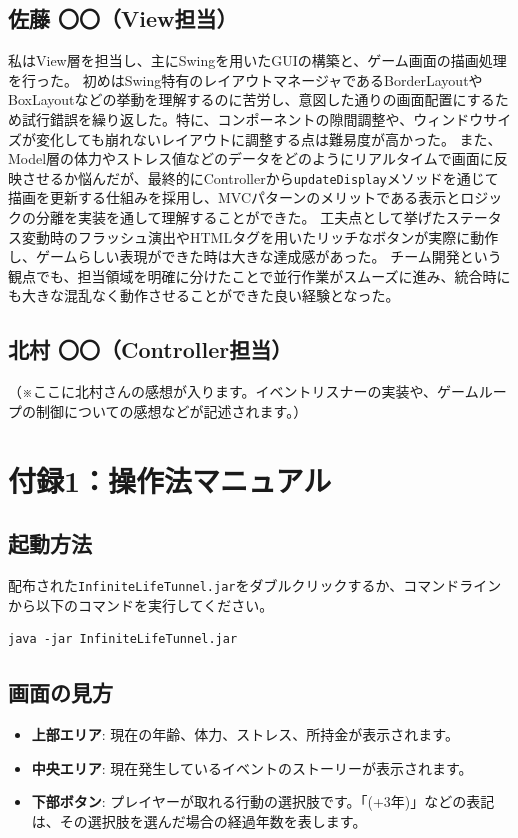 \documentclass[a4paper,11pt]{jsarticle}
\begin{document}
\subsection{佐藤 〇〇（View担当）}
私はView層を担当し、主にSwingを用いたGUIの構築と、ゲーム画面の描画処理を行った。
初めはSwing特有のレイアウトマネージャであるBorderLayoutやBoxLayoutなどの挙動を理解するのに苦労し、意図した通りの画面配置にするため試行錯誤を繰り返した。特に、コンポーネントの隙間調整や、ウィンドウサイズが変化しても崩れないレイアウトに調整する点は難易度が高かった。
また、Model層の体力やストレス値などのデータをどのようにリアルタイムで画面に反映させるか悩んだが、最終的にControllerから\texttt{updateDisplay}メソッドを通じて描画を更新する仕組みを採用し、MVCパターンのメリットである表示とロジックの分離を実装を通して理解することができた。
工夫点として挙げたステータス変動時のフラッシュ演出やHTMLタグを用いたリッチなボタンが実際に動作し、ゲームらしい表現ができた時は大きな達成感があった。
チーム開発という観点でも、担当領域を明確に分けたことで並行作業がスムーズに進み、統合時にも大きな混乱なく動作させることができた良い経験となった。

\subsection{北村 〇〇（Controller担当）}
（※ここに北村さんの感想が入ります。イベントリスナーの実装や、ゲームループの制御についての感想などが記述されます。）

\appendix
\section{付録1：操作法マニュアル}

\subsection*{起動方法}
配布された\texttt{InfiniteLifeTunnel.jar}をダブルクリックするか、コマンドラインから以下のコマンドを実行してください。
\begin{verbatim}
java -jar InfiniteLifeTunnel.jar
\end{verbatim}

\subsection*{画面の見方}
\begin{itemize}
    \item \textbf{上部エリア}: 現在の年齢、体力、ストレス、所持金が表示されます。
    \item \textbf{中央エリア}: 現在発生しているイベントのストーリーが表示されます。
    \item \textbf{下部ボタン}: プレイヤーが取れる行動の選択肢です。「(+3年)」などの表記は、その選択肢を選んだ場合の経過年数を表します。
\end{itemize}
\end{document}
